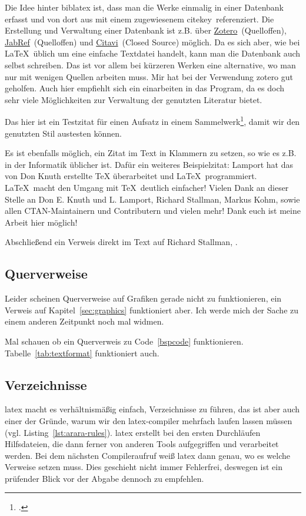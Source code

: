 Die Idee hinter biblatex ist, dass man die Werke einmalig in einer Datenbank erfasst und von dort aus mit einem zugewiesenem \glqq citekey\grqq\ referenziert. Die Erstellung und Verwaltung einer Datenbank ist z.B. über \href{https://www.zotero.org/}{Zotero}\ (Quelloffen), \href{https://www.jabref.org/}{JabRef}\ (Quelloffen) und \href{https://www.citavi.com/}{Citavi}\ (Closed Source) möglich. Da es sich aber, wie bei \LaTeX{}\ üblich um eine einfache Textdatei handelt, kann man die Datenbank auch selbst
schreiben. Das ist vor allem bei kürzeren Werken eine alternative, wo man nur mit wenigen Quellen arbeiten muss.
Mir hat bei der Verwendung zotero gut geholfen. Auch hier empfiehlt sich ein einarbeiten in das Program, da es doch sehr viele Möglichkeiten zur Verwaltung der genutzten Literatur bietet.

Das hier ist ein Testzitat für einen Aufsatz in einem Sammelwerk\footcite[][]{billen_kundenbindung_2005}, damit wir den genutzten Stil austesten können.

Es ist ebenfalls möglich, ein Zitat im Text in Klammern zu setzen, so wie es z.B. in der Informatik üblicher ist. Dafür ein weiteres Beispielzitat: Lamport\parencite[Siehe ]{lamport_latex_1994} hat das von Don Knuth\parencite[Siehe ]{knuth_tex_1979} erstellte \TeX{} überarbeitet und \LaTeX{}\ programmiert. \LaTeX{}\ macht den Umgang mit \TeX{}\ deutlich einfacher! Vielen Dank an dieser Stelle an Don E. Knuth und L. Lamport, Richard Stallman, Markus Kohm, sowie allen CTAN-Maintainern und Contributern und vielen mehr! Dank euch ist meine Arbeit hier möglich!

Abschließend ein Verweis direkt im Text auf Richard Stallman, \cite[siehe ][S. 6 -- 18]{dibona_open_1999}.
\subsection{Querverweise}%
\label{sec:refs}
Leider scheinen Querverweise auf Grafiken gerade nicht zu funktionieren, ein Verweis auf Kapitel~\ref{sec:graphics} funktioniert aber. Ich werde mich der Sache zu einem anderen Zeitpunkt noch mal widmen.

Mal schauen ob ein Querverweis zu Code~\ref{bspcode} funktionieren. Tabelle~\ref{tab:textformat} funktioniert auch.
\subsection{Verzeichnisse}%
\label{sec:catalogs}
\gls{latex} macht es verhältnismäßig einfach, Verzeichnisse zu führen, das ist aber auch einer der Gründe, warum wir den \gls{latex}-\gls{compiler} mehrfach laufen lassen müssen (vgl. Listing~\ref{lst:arara-rules}). \gls{latex} erstellt bei den ersten Durchläufen Hilfsdateien, die dann ferner von anderen Tools aufgegriffen und verarbeitet werden. Bei dem nächsten Compileraufruf weiß \gls{latex} dann genau, wo es welche Verweise setzen muss. Dies geschieht nicht immer Fehlerfrei, deswegen ist ein prüfender Blick vor der Abgabe dennoch zu empfehlen.

